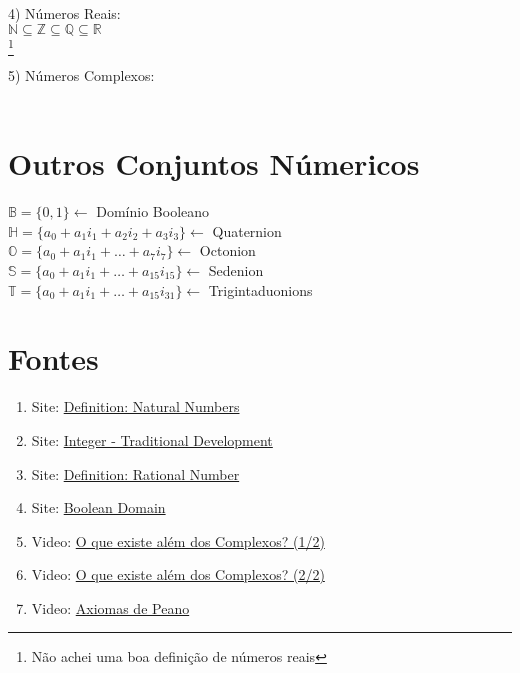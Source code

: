 \documentclass[a4paper]{article}
\newcommand{\N}{\mathbb{N}}
\newcommand{\Z}{\mathbb{Z}}
\newcommand{\Q}{\mathbb{Q}}
\newcommand{\R}{\mathbb{R}}
\newcommand{\B}{\mathbb{B}}
\begin{document}
4) Números Reais:\\

$\N \subseteq \Z \subseteq \Q \subseteq \R$\\
\footnote[1]{Não achei uma boa definição de números reais}

5) Números Complexos:\\

\\

\section{Outros Conjuntos Númericos}

$\B = \{0,1\} \longleftarrow$ Domínio Booleano\\ 
$\mathbb{H} = \{a_0 + a_1 i_1 + a_2 i_2 + a_3 i_3\} \longleftarrow$ Quaternion\\
$\mathbb{O} = \{a_0 + a_1 i_1 + \dots + a_7 i_7\} \longleftarrow$ Octonion\\
$\mathbb{S} = \{a_0 + a_1 i_1 + \dots + a_{15} i_{15}\} \longleftarrow$ Sedenion\\
$\mathbb{T} = \{a_0 + a_1 i_1 + \dots + a_{15} i_{31}\} \longleftarrow$ Trigintaduonions\\

\section*{Fontes}
\begin{enumerate}
\item Site: \href{https://proofwiki.org/wiki/Definition:Natural_Numbers}{Definition: Natural Numbers}
\item Site: \href{https://en.wikipedia.org/wiki/Integer#Traditional_development}{Integer - Traditional Development}
\item Site: \href{https://proofwiki.org/wiki/Definition:Rational_Number}{Definition: Rational Number}
\item Site: \href{https://en.wikipedia.org/wiki/Boolean_domain}{Boolean Domain}
\item Video: \href{https://www.youtube.com/watch?v=Sa7XIcMej58}{O que existe além dos Complexos? (1/2)}
\item Video: \href{https://www.youtube.com/watch?v=yGDHMYVGiPM}{O que existe além dos Complexos? (2/2)}
\item Video: \href{https://www.youtube.com/watch?v=U3M25j9e4cw}{Axiomas de Peano}
\end{enumerate}
\end{document}
